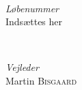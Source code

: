 	\HRule\\[1.5cm]






	\begin{minipage}{0.4\textwidth}
		\begin{flushleft}
			\large
			\textit{Løbenummer}\\
			Indsættes her\\
		\end{flushleft}
	\end{minipage}
	~
	\begin{minipage}{0.4\textwidth}
		\begin{flushright}
			\large
			\textit{Vejleder}\\
			Martin \textsc{Bisgaard} %
		\end{flushright}
	\end{minipage}

